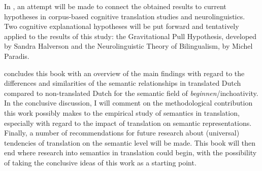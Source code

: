 In , an attempt will be made to connect the obtained results to current hypotheses in corpus-based cognitive translation studies and neurolinguistics. Two cognitive explanational hypotheses will be put forward and tentatively applied to the results of this study: the Gravitational Pull Hypothesis, developed by Sandra Halverson and the Neurolinguistic Theory of Bilingualism, by Michel Paradis.



 concludes this book with an overview of the main findings with regard to the differences and similarities of the semantic relationships in translated Dutch compared to non-translated Dutch for the semantic field of \textit{beginnen}/inchoativity. In the conclusive discussion, I will comment on the methodological contribution this work possibly makes to the empirical study of semantics in translation, especially with regard to the impact of translation on semantic representations. Finally, a number of recommendations for future research about (universal) tendencies of translation on the semantic level will be made. This book will then end where research into semantics in translation could begin, with the possibility of taking the conclusive ideas of this work as a starting point.


